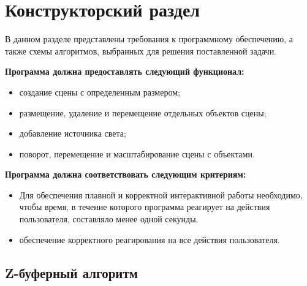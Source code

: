 \chapter{Конструкторский раздел}


В данном разделе представлены требования к программному обеспечению, а также схемы алгоритмов, выбранных для решения поставленной задачи.

\textbf{Программа должна предоставлять следующий функционал:}
\begin{itemize}
	\item создание сцены с определенным размером;
	\item размещение, удаление и перемещение отдельных объектов сцены;
	\item добавление источника света;
	\item поворот, перемещение и масштабирование сцены  с объектами.
\end{itemize}

\textbf{Программа должна соответствовать следующим критериям: }
\begin{itemize}
	\item Для обеспечения плавной и корректной интерактивной работы необходимо, чтобы время, в течение которого программа реагирует на действия пользователя, составляло менее одной секунды.
	\item обеспечение корректного реагирования на все действия пользователя.
\end{itemize}


\section{Z-буферный алгоритм}

